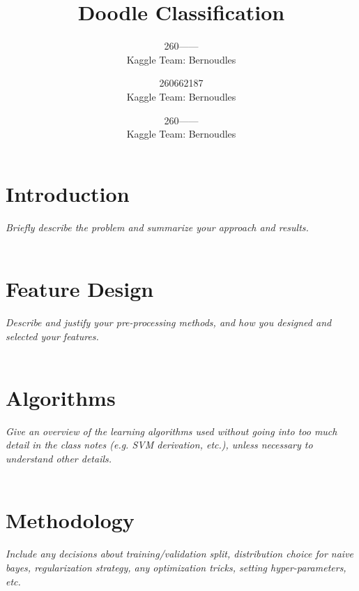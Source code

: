 \documentclass[conference]{IEEEtran}
\begin{document}
\title{Doodle Classification}

\author{
	260------ \\
	Kaggle Team: Bernoudles \\
	\and
	260662187 \\
	Kaggle Team: Bernoudles \\
	\and
	260------ \\
	Kaggle Team: Bernoudles \\
}

\maketitle

\section{Introduction} 
\emph{Briefly describe the problem and summarize your approach and results.}
\\
\\

\section{Feature Design} 
\emph{Describe and justify your pre-processing methods, and how you designed and selected your features.}
\\
\\

\section{Algorithms}
\emph{Give an overview of the learning algorithms used without going into too much detail in the class notes (e.g. SVM derivation, etc.), unless necessary to understand other details.}
\\
\\

\section{Methodology}
\emph{Include any decisions about training/validation split, distribution choice for naive bayes, regularization strategy, any optimization tricks, setting hyper-parameters, etc.}
\\
\\
\end{document}
